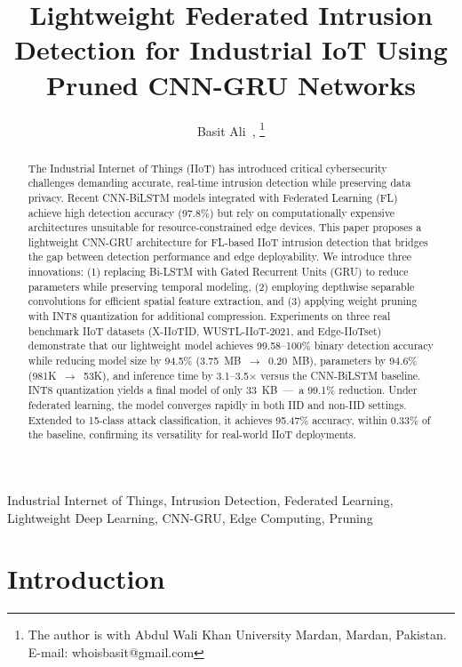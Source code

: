 \documentclass[10pt,journal]{IEEEtran}
\begin{document}
\title{Lightweight Federated Intrusion Detection for Industrial IoT Using Pruned CNN-GRU Networks}

\author{Basit Ali~\IEEEmembership{},
        \thanks{The author is with Abdul Wali Khan University Mardan, Mardan, Pakistan.
                E-mail: whoisbasit@gmail.com}}

\maketitle

\begin{abstract}
The Industrial Internet of Things (IIoT) has introduced critical cybersecurity challenges demanding accurate, real-time intrusion detection while preserving data privacy. Recent CNN-BiLSTM models integrated with Federated Learning (FL) achieve high detection accuracy (97.8\%) but rely on computationally expensive architectures unsuitable for resource-constrained edge devices. This paper proposes a lightweight CNN-GRU architecture for FL-based IIoT intrusion detection that bridges the gap between detection performance and edge deployability. We introduce three innovations: (1) replacing Bi-LSTM with Gated Recurrent Units (GRU) to reduce parameters while preserving temporal modeling, (2) employing depthwise separable convolutions for efficient spatial feature extraction, and (3) applying weight pruning with INT8 quantization for additional compression. Experiments on three real benchmark IIoT datasets (X-IIoTID, WUSTL-IIoT-2021, and Edge-IIoTset) demonstrate that our lightweight model achieves 99.58--100\% binary detection accuracy while reducing model size by 94.5\% (3.75~MB~$\rightarrow$~0.20~MB), parameters by 94.6\% (981K~$\rightarrow$~53K), and inference time by 3.1--3.5$\times$ versus the CNN-BiLSTM baseline. INT8 quantization yields a final model of only 33~KB~---~a 99.1\% reduction. Under federated learning, the model converges rapidly in both IID and non-IID settings. Extended to 15-class attack classification, it achieves 95.47\% accuracy, within 0.33\% of the baseline, confirming its versatility for real-world IIoT deployments.
\end{abstract}

\begin{IEEEkeywords}
Industrial Internet of Things, Intrusion Detection, Federated Learning, Lightweight Deep Learning, CNN-GRU, Edge Computing, Pruning
\end{IEEEkeywords}

\section{Introduction}
\label{sec:intro}
\end{document}
